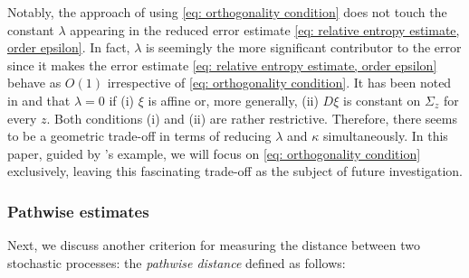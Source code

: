 \documentclass[reqno, 12pt]{article}
\begin{document}
Notably, the approach of using \eqref{eq: orthogonality condition} does not touch the constant $\lambda$ appearing in the reduced error estimate \eqref{eq: relative entropy estimate, order epsilon}. In fact, $\lambda$ is seemingly the more significant contributor to the error since it makes the error estimate \eqref{eq: relative entropy estimate, order epsilon} behave as $O(1)$ irrespective of \eqref{eq: orthogonality condition}. It has been noted in \cite{legoll2010effective} and \cite{duong2018quantification} that $\lambda = 0$ if (i) $\xi$ is affine or, more generally, (ii) $D\xi$ is constant on $\Sigma_z$ for every $z$. Both conditions (i) and (ii) are rather restrictive. 
Therefore, there seems to be a geometric trade-off in terms of reducing $\lambda$ and $\kappa$ simultaneously. In this paper, guided by \cite{legoll2010effective}'s example, we will focus on \eqref{eq: orthogonality condition} exclusively, leaving this fascinating trade-off as the subject of future investigation. 


\subsubsection{Pathwise estimates}

Next, we discuss another criterion for measuring the distance between two stochastic processes: the \emph{pathwise distance} defined as follows: 
\end{document}
